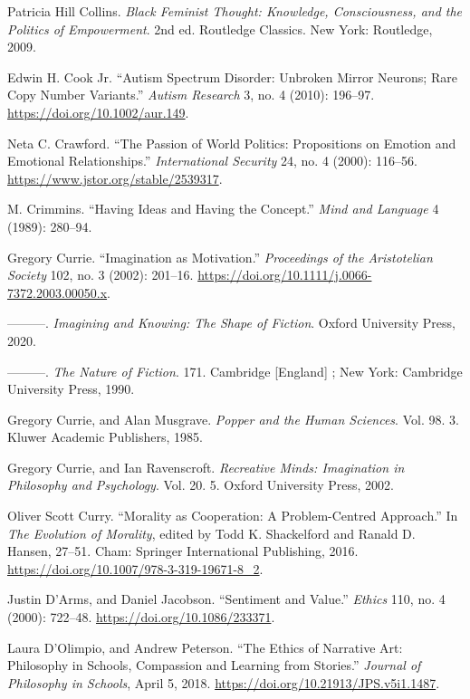 \documentclass[phdthesis,12pt,final,a4paper]{wuthesis}
\newlength{\cslhangindent}
\newenvironment{CSLReferences}[2] %
{\begin{list}{}{%
	\setlength{\itemindent}{0pt}
	\setlength{\leftmargin}{0pt}
	\setlength{\parsep}{0pt}
	\ifodd #1
	\setlength{\leftmargin}{\cslhangindent}
	\setlength{\itemindent}{-1\cslhangindent}
	\fi
	\setlength{\itemsep}{#2\baselineskip}}}
{\end{list}}
\theoremstyle{definition}
\theoremstyle{definition}
\theoremstyle{definition}
\theoremstyle{definition}
\theoremstyle{remark}
\begin{document}
\begin{CSLReferences}{1}{0}
Patricia Hill Collins. \emph{Black Feminist Thought: Knowledge, Consciousness, and the Politics of Empowerment}. 2nd ed. Routledge Classics. New York: Routledge, 2009.

Edwin H. Cook Jr. {``Autism Spectrum Disorder: Unbroken Mirror Neurons; Rare Copy Number Variants.''} \emph{Autism Research} 3, no. 4 (2010): 196--97. \url{https://doi.org/10.1002/aur.149}.

Neta C. Crawford. {``The Passion of World Politics: Propositions on Emotion and Emotional Relationships.''} \emph{International Security} 24, no. 4 (2000): 116--56. \url{https://www.jstor.org/stable/2539317}.

M. Crimmins. {``Having Ideas and Having the Concept.''} \emph{Mind and Language} 4 (1989): 280--94.

Gregory Currie. {``Imagination as Motivation.''} \emph{Proceedings of the Aristotelian Society} 102, no. 3 (2002): 201--16. \url{https://doi.org/10.1111/j.0066-7372.2003.00050.x}.

---------. \emph{Imagining and Knowing: The Shape of Fiction}. Oxford University Press, 2020.

---------. \emph{The Nature of Fiction}. 171. Cambridge {[}England{]} ; New York: Cambridge University Press, 1990.

Gregory Currie, and Alan Musgrave. \emph{Popper and the Human Sciences}. Vol. 98. 3. Kluwer Academic Publishers, 1985.

Gregory Currie, and Ian Ravenscroft. \emph{Recreative Minds: Imagination in Philosophy and Psychology}. Vol. 20. 5. Oxford University Press, 2002.

Oliver Scott Curry. {``Morality as {Cooperation}: {A Problem-Centred Approach}.''} In \emph{The {Evolution} of {Morality}}, edited by Todd K. Shackelford and Ranald D. Hansen, 27--51. Cham: Springer International Publishing, 2016. \url{https://doi.org/10.1007/978-3-319-19671-8_2}.

Justin D'Arms, and Daniel Jacobson. {``Sentiment and {Value}.''} \emph{Ethics} 110, no. 4 (2000): 722--48. \url{https://doi.org/10.1086/233371}.

Laura D'Olimpio, and Andrew Peterson. {``The Ethics of Narrative Art: Philosophy in Schools, Compassion and Learning from Stories.''} \emph{Journal of Philosophy in Schools}, April 5, 2018. \url{https://doi.org/10.21913/JPS.v5i1.1487}.


\end{CSLReferences}
\end{document}
